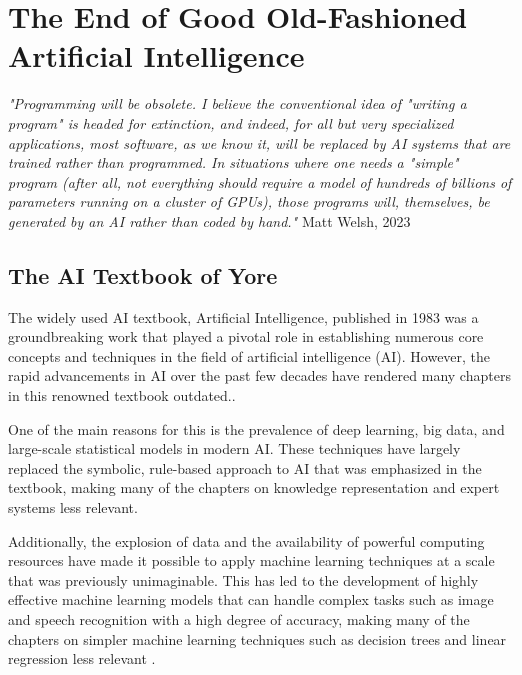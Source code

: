 \setchapterpreamble[u]{\margintoc}
\chapter{The End of Good Old-Fashioned Artificial Intelligence}

\textit{"Programming will be obsolete. I believe the conventional idea of "writing a program" is headed for extinction, and indeed, for all but very specialized applications, most software, as we know it, will be replaced by AI systems that are trained rather than programmed. In situations where one needs a "simple" program (after all, not everything should require a model of hundreds of billions of parameters running on a cluster of GPUs), those programs will, themselves, be generated by an AI rather than coded by hand."} Matt Welsh, 2023 \cite{welsh2023}

\section{The AI Textbook of Yore}

The widely used AI textbook, Artificial Intelligence, published in 1983 was a groundbreaking work that played a pivotal role in establishing numerous core concepts and techniques in the field of artificial intelligence (AI). However, the rapid advancements in AI over the past few decades have rendered many chapters in this renowned textbook outdated..

One of the main reasons for this is the prevalence of deep learning, big data, and large-scale statistical models in modern AI. These techniques have largely replaced the symbolic, rule-based approach to AI that was emphasized in the textbook, making many of the chapters on knowledge representation and expert systems less relevant.

Additionally, the explosion of data and the availability of powerful computing resources have made it possible to apply machine learning techniques at a scale that was previously unimaginable. This has led to the development of highly effective machine learning models that can handle complex tasks such as image and speech recognition with a high degree of accuracy, making many of the chapters on simpler machine learning techniques such as decision trees and linear regression less relevant .


